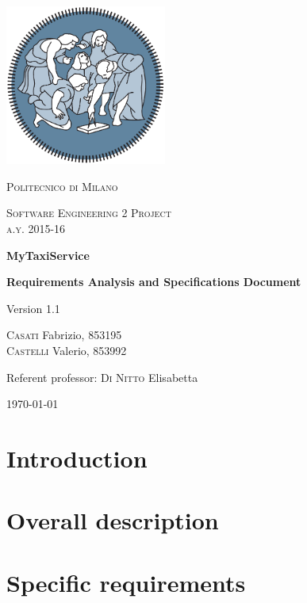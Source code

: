 



\begin{titlepage}
	\centering
	\includegraphics[width=150pt]{images/polimi_logo}\par\vspace{1cm}
	{\scshape\LARGE
		Politecnico di Milano\par}
	\vspace{1cm}
	{\scshape\Large
		Software Engineering 2 Project\\
		a.y. 2015-16\par}
	\vspace{1.5cm}
	{\huge\bfseries
		MyTaxiService\\\par}
	{\Large\bfseries
		Requirements Analysis and Specifications Document\par}
	Version 1.1\par
	\vspace{2cm}
	{\Large
		{\scshape Casati} Fabrizio, 853195\\
		{\scshape Castelli} Valerio, 853992\par}
	\vfill
	Referent professor: {\scshape Di Nitto} Elisabetta\par
	\vfill
	{\large\today\par}
\end{titlepage}

\tableofcontents

\chapter{Introduction}


\chapter{Overall description}


\chapter{Specific requirements}


